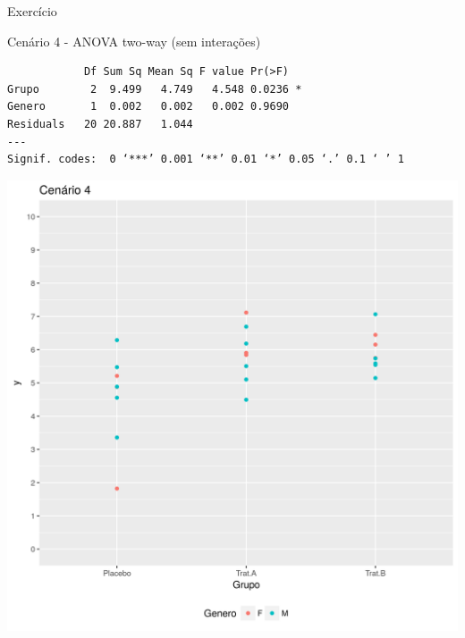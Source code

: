 \documentclass{beamer}
\begin{document}
\begin{frame}[fragile]{Exercício}
  \begin{exampleblock}{Cenário 4 - ANOVA two-way (sem interações)}
    \tiny
\begin{verbatim}
            Df Sum Sq Mean Sq F value Pr(>F)  
Grupo        2  9.499   4.749   4.548 0.0236 *
Genero       1  0.002   0.002   0.002 0.9690  
Residuals   20 20.887   1.044                 
---
Signif. codes:  0 ‘***’ 0.001 ‘**’ 0.01 ‘*’ 0.05 ‘.’ 0.1 ‘ ’ 1
\end{verbatim}
    \begin{center}
      \includegraphics[height=.5\textheight]{Cap13-30/cenario22}
    \end{center}
  \end{exampleblock}
\end{frame}
\end{document}

